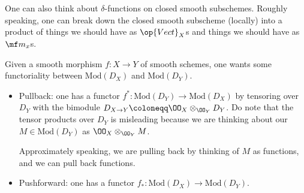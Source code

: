 \documentclass{article}
\begin{document}
\begin{example}
	One can also think about $\delta$-functions on closed smooth subschemes. Roughly speaking, one can break down the closed smooth subscheme (locally) into a product of things we should have as $\op{Vect}_X$s and things we should have as $\mf m_x$s.
\end{example}
Given a smooth morphism $f\colon X\to Y$ of smooth schemes, one wants some functoriality between $\mathrm{Mod}(D_X)$ and $\mathrm{Mod}(D_Y)$.
\begin{itemize}
	\item Pullback: one has a functor $f^*\colon\mathrm{Mod}(D_Y)\to\mathrm{Mod}(D_X)$ by tensoring over $D_Y$ with the bimodule $D_{X\to Y}\coloneqq\OO_X\otimes_{\OO_Y}D_Y$. Do note that the tensor products over $D_Y$ is misleading because we are thinking about our $M\in\mathrm{Mod}(D_Y)$ as $\OO_X\otimes_{\OO_Y}M$.
	
	Approximately speaking, we are pulling back by thinking of $M$ as functions, and we can pull back functions.

	\item Pushforward: one has a functor $f_*\colon\mathrm{Mod}(D_X)\to\mathrm{Mod}(D_Y)$.
\end{itemize}
\end{document}
